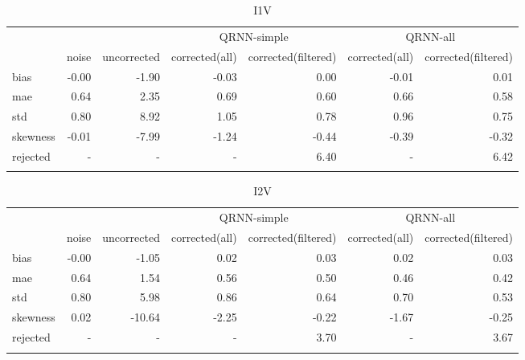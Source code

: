 \documentclass[amt, manuscript]{copernicus}
\begin{document}
\begin{table}[t]
	\caption{I1V}
	\label{tab:I1V_statistics}
	\begin{tabular}{lrrrrrr}
		\tophline
		&&& \multicolumn{2}{c}{QRNN-simple} & \multicolumn{2}{c}{QRNN-all}\\
		&   noise &   uncorrected &   corrected(all) &   corrected(filtered) & corrected(all) &   corrected(filtered) \\
		\middlehline
		bias     &   -0.00 &         -1.90 &           -0.03 &                 0.00 & -0.01 &                 0.01 \\
		mae      &    0.64 &          2.35 &            0.69 &                 0.60 & 0.66 &                 0.58\\
		std      &    0.80 &          8.92 &            1.05 &                 0.78 &  0.96 &                 0.75\\
		skewness &   -0.01 &         -7.99 &           -1.24 &                -0.44 & -0.39 &                -0.32\\
		rejected &    	 - &          - &            - &                 6.40 & - &                 6.42 \\
		\bottomhline
	\end{tabular}
	\belowtable{} %
\end{table}
\begin{table}[t]
	\caption{I2V}
	\label{tab:I2V_statistics}
	\begin{tabular}{lrrrrrr}
		\tophline
		&&& \multicolumn{2}{c}{QRNN-simple} & \multicolumn{2}{c}{QRNN-all}\\
		&   noise &   uncorrected &   corrected(all) &   corrected(filtered) & corrected(all) &   corrected(filtered) \\
		\middlehline
		bias     &   -0.00 &         -1.05 &            0.02 &                 0.03&  0.02&   0.03\\
		mae      &    0.64 &          1.54 &            0.56 &                 0.50&  0.46&   0.42\\
		std      &    0.80 &          5.98 &            0.86 &                 0.64&  0.70&   0.53\\
		skewness &    0.02 &        -10.64 &           -2.25 &                -0.22& -1.67&  -0.25\\
		rejected &    - &          - &            - &                 3.70&  - &   3.67\\
		\bottomhline
	\end{tabular}
	\belowtable{} %
\end{table}
\end{document}
